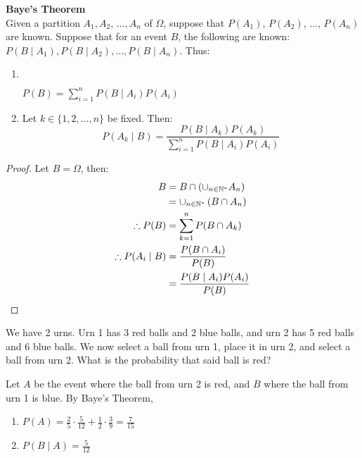 \documentclass{article}
\begin{document}
	\begin{thm} \textbf{Baye's Theorem}\\
		Given a partition $A_1, A_2, \,\dots, A_n$ of $\Omega$, suppose that $P(A_1)$, $P(A_2)$, $\dots$, $P(A_n)$ are known. Suppose that for an event $B$, the following are known: $P(B \mid A_1), P(B \mid A_2), \dots, P(B \mid A_n)$. Thus:
		\begin{enumerate}
			\item $\quad$ 
			\begin{center}
				$P(B) = \sum_{i= 1}^n P(B \mid A_i) P(A_i) $
			\end{center}
			
			\item Let $k \in \{1, 2, \dots, n\}$ be fixed. Then: $$ P(A_k \mid B ) = \frac{P (B \mid A_k) P(A_k)}{\sum_{i=1}^n P(B\mid A_i) P(A_i)}$$
		\end{enumerate}
	\end{thm}
	\begin{proof}
		Let $B = \Omega$, then:
		\vspace{-1cm}
		\begin{align*}
			B &= B \cap \left( \cup_{n \in \mathbb{N}^*} A_n \right) \\
			&= \cup_{n \in \mathbb{N}^*} \left( B \cap A_n \right) \\
			\therefore P(B) &= \sum_{k=1}^n P(B \cap A_k) \\
			\therefore P(A_i \mid B) &= \frac{P(B \cap A_i)}{P(B)} \\
			&= \frac{P(B \mid A_i) P(A_i)}{P(B)}
		\end{align*}
	\end{proof}
	\begin{exmp}
		We have 2 urns. Urn 1 has 3 red balls and 2 blue balls, and urn 2 has 5 red balls and 6 blue balls. We now select a ball from urn 1, place it in urn 2, and select a ball from urn 2. What is the probability that said ball is red?
		\begin{sol}
			Let $A$ be the event where the ball from urn 2 is red, and $B$ where the ball from urn 1 is blue. By Baye's Theorem,
			\begin{enumerate}
				\item$ P(A) = \frac{2}{5} \cdot \frac{5}{12} + \frac{1}{2}\cdot \frac{3}{9} = \frac{7}{15}$
				\item $P(B \mid A) = \frac{5}{12} $
			\end{enumerate}
		\end{sol}
	\end{exmp}
\end{document}
